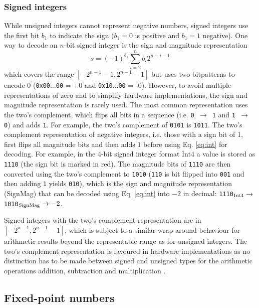 \subsubsection{Signed integers}
\label{sec:int}

While unsigned integers cannot represent negative numbers, signed integers use the first bit $b_1$ to indicate the sign ($b_1 = 0$ is
positive and $b_1 = 1$ negative). One way to decode an $n$-bit signed integer is the sign and magnitude representation
\begin{equation}
	s = (-1)^{b_1}\sum_{i=2}^{n} b_i 2^{n-i-1}
	\label{eq:int}
\end{equation}
which covers the range $[-2^{n-1}-1,2^{n-1}-1]$ but uses two bitpatterns to encode 0 (\texttt{0x00$\dots$00} = +0 and \texttt{0x10$\dots$00} = -0).
However, to avoid multiple representations of zero and to simplify hardware implementations, the sign and magnitude representation
is rarely used. The most common representation uses the two's complement, which flips all bits in a sequence (i.e. \texttt{0 $\to$ 1} and \texttt{1 $\to$ 0})
and adds \texttt{1}. For example, the two's complement of \texttt{0101} is \texttt{1011}. The two's complement representation of negative
integers, i.e. those with a sign bit of 1, first flips all magnitude bits and then adds $1$ before using Eq. \ref{eq:int} for decoding. For example,
in the 4-bit signed integer format Int4 a value is stored as \texttt{{\color{psign}1}110} (the sign bit is marked in red). The magnitude bits of
\texttt{{\color{psign}1}110} are then converted using the two's complement to \texttt{{\color{psign}1}010} (\texttt{110} is bit flipped into \texttt{001}
and then adding \texttt{1} yields \texttt{010}), which is the sign and magnitude representation (SignMag) that can be decoded using Eq. \ref{eq:int}
into $-2$ in decimal: \texttt{{\color{psign}1}110}$_{\operatorname{Int4}} \to$ \texttt{{\color{psign}1}010}$_{\operatorname{SignMag}} \to -2$. 

Signed integers with the two's complement representation are in $[-2^{n-1},2^{n-1}-1]$, which is subject to a similar wrap-around behaviour 
for arithmetic results beyond the representable range as for unsigned integers. The two's complement representation
is favoured in hardware implementations as no distinction has to be made between signed and unsigned types for the
arithmetic operations addition, subtraction and multiplication \citep{Choo2003}.

\subsection{Fixed-point numbers}
\label{sec:fixpoints}

